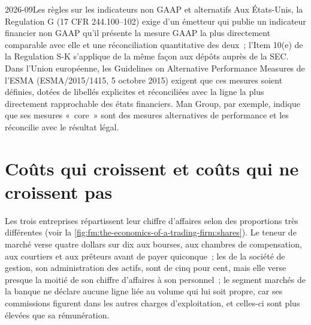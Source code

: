 \begin{dated}{2026-09}{Les règles sur les indicateurs non GAAP et alternatifs}\label{dat:fm:the-economics-of-a-trading-firm:rules}
Aux États-Unis, la Regulation G (17 CFR 244.100--102) exige d'un émetteur qui publie un indicateur financier non GAAP qu'il présente la mesure GAAP la plus
directement comparable avec elle et une réconciliation quantitative des deux~; l'Item 10(e) de la Regulation S-K s'applique de la même façon aux dépôts auprès
de la SEC. Dans l'Union européenne, les Guidelines on Alternative Performance Measures de l'ESMA (ESMA/2015/1415, 5 octobre 2015) exigent que ces mesures soient
définies, dotées de libellés explicites et réconciliées avec la ligne la plus directement rapprochable des états financiers. Man Group, par exemple, indique
que ses mesures «~core~» sont des mesures alternatives de performance et les réconcilie avec le résultat légal.
\end{dated}

\section{Coûts qui croissent et coûts qui ne croissent pas}

Les trois entreprises répartissent leur chiffre d'affaires selon des proportions très différentes (voir la \cref{fig:fm:the-economics-of-a-trading-firm:shares}). Le teneur de marché verse
quatre dollars sur dix aux bourses, aux chambres de compensation, aux courtiers et aux prêteurs avant de payer quiconque~; les  de la société de gestion, son
administration des actifs, sont de cinq pour cent, mais elle verse presque la moitié de son chiffre d'affaires à son personnel~; le segment marchés de la banque ne déclare aucune ligne liée au volume qui lui soit propre,
car ses commissions figurent dans les autres charges d'exploitation, et celles-ci sont plus élevées que sa rémunération.


